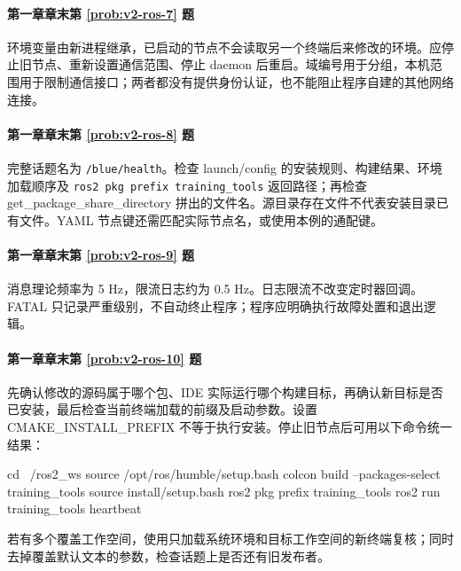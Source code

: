 \paragraph*{第一章章末第 \ref{prob:v2-ros-7} 题}
\begin{solution}
环境变量由新进程继承，已启动的节点不会读取另一个终端后来修改的环境。应停止旧节点、重新设置通信范围、停止 daemon 后重启。域编号用于分组，本机范围用于限制通信接口；两者都没有提供身份认证，也不能阻止程序自建的其他网络连接。
\end{solution}

\paragraph*{第一章章末第 \ref{prob:v2-ros-8} 题}
\begin{solution}
完整话题名为 \nolinkurl{/blue/health}。检查 launch/config 的安装规则、构建结果、环境加载顺序及 \texttt{ros2 pkg prefix training\_tools} 返回路径；再检查 get\_package\_share\_directory 拼出的文件名。源目录存在文件不代表安装目录已有文件。YAML 节点键还需匹配实际节点名，或使用本例的通配键。
\end{solution}

\paragraph*{第一章章末第 \ref{prob:v2-ros-9} 题}
\begin{solution}
消息理论频率为 5 Hz，限流日志约为 0.5 Hz。日志限流不改变定时器回调。FATAL 只记录严重级别，不自动终止程序；程序应明确执行故障处置和退出逻辑。
\end{solution}

\paragraph*{第一章章末第 \ref{prob:v2-ros-10} 题}
\begin{solution}
先确认修改的源码属于哪个包、IDE 实际运行哪个构建目标，再确认新目标是否已安装，最后检查当前终端加载的前缀及启动参数。设置 CMAKE\_INSTALL\_PREFIX 不等于执行安装。停止旧节点后可用以下命令统一结果：
\begin{tbash}
cd ~/ros2_ws
source /opt/ros/humble/setup.bash
colcon build --packages-select training_tools
source install/setup.bash
ros2 pkg prefix training_tools
ros2 run training_tools heartbeat
\end{tbash}
若有多个覆盖工作空间，使用只加载系统环境和目标工作空间的新终端复核；同时去掉覆盖默认文本的参数，检查话题上是否还有旧发布者。
\end{solution}

